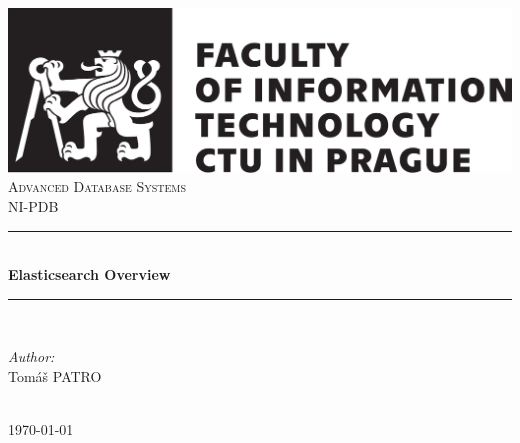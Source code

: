 \documentclass[12pt,a4,twoside]{article}
\begin{document}
\begin{titlepage}

\newcommand{\HRule}{\rule{\linewidth}{0.1mm}}

\center
 

\includegraphics[scale=.75]{graphics/logo-fit-en-cerna.pdf}\\[2cm]
\textsc{\Large Advanced Database Systems}\\[0.5cm]
\textsc{\large NI-PDB}\\[0.5cm]


\HRule \\[0.4cm]
{ \huge \bfseries Elasticsearch Overview}\\[0.4cm]
\HRule \\[1.5cm]
 

\begin{minipage}{0.4\textwidth}
\begin{flushleft} \large
\emph{Author:}\\
Tomáš \textsc{PATRO}\\
\end{flushleft}

\end{minipage}\\[2cm]


{\large \today}\\[2cm]

\vfill

\end{titlepage}
\end{document}
